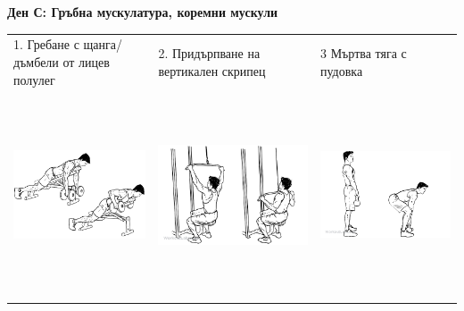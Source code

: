 \documentclass{article}
\begin{document}
\newpage
\textbf{Ден С: Гръбна мускулатура, коремни мускули}\\
\begin{tabular}{ | m{5cm} | m{5cm} | m{5cm} | }
\hline
1. Гребане с щанга/дъмбели от лицев полулег& 
2. Придърпване на вертикален скрипец   & 
3  Мъртва тяга с пудовка\\ 
\begin{minipage}{5cm} \includegraphics[width=\linewidth, height=60mm]{Dumbbell_Incline_Row.png} \end{minipage}&
\begin{minipage}{5cm} \includegraphics[width=\linewidth, height=60mm]{Wide-Grip_Lat_Pulldown.png} \end{minipage}& 
\begin{minipage}{5cm} \includegraphics[width=\linewidth, height=60mm]{Kettlebell_Deadlifts.png} \end{minipage} \\ 

\end{tabular}
\end{document}
